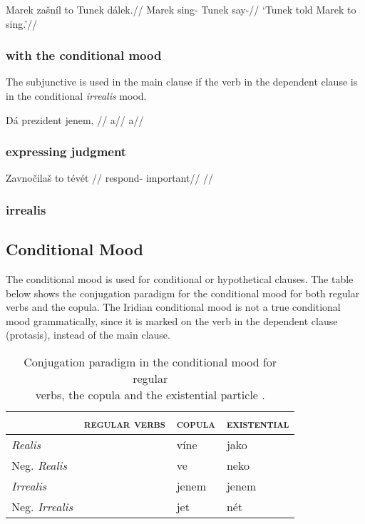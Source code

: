 \pex
\begingl
\gla Marek zašníl to Tunek dálek.//
\glb Marek sing-  Tunek say-//
\glft `Tunek told Marek to sing.'//
\endgl
\xe


\subsubsection{with the conditional mood}
\par The subjunctive is used in the main clause if the verb in the dependent clause is in the conditional \textit{irrealis} mood.

\pex
\begingl
\gla Dá prezident jenem, //
\glb a//
\glft a//
\endgl
\xe

\subsubsection{expressing judgment}

\pex
\begingl
\gla Zavnočilaš to tévét //
\glb respond-  important//
\glft {}//
\endgl
\xe

\subsubsection{irrealis}

\subsection{Conditional Mood}\label{sec:conditional}
\par The conditional mood is used for conditional or hypothetical clauses. The table below shows the conjugation paradigm for the conditional mood for both regular verbs and the copula. The Iridian conditional mood is not a true conditional mood grammatically, since it is marked on the verb in the dependent clause (protasis), instead of the main clause.

\begin{table}[h!]
	\small
	\caption{Conjugation paradigm in the conditional mood for regular \\verbs, the copula and the existential particle .}\medskip
	\begin{tabu} to 0.9 \textwidth	{Y[1.3]Y[1.3]YY}
		\toprule
		&{\scshape regular verbs} & {\scshape copula} & {\scshape existential}\\
		\midrule

		\textit{Realis} 				& &víne & jako\\
		Neg. \textit{Realis}		&&ve&neko\\

		\textit{Irrealis} 			& & jenem & jenem\\
		Neg. \textit{Irrealis} 	& & jet & nét\\
		\bottomrule
	\end{tabu}
\end{table}

